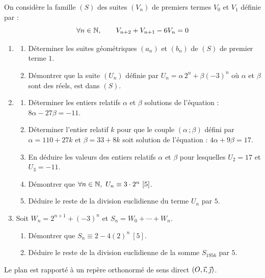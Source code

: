 \documentclass[11pt]{article}
\begin{document}


On considère la famille $(S)$ des suites $(V_n)$ de premiers termes $V_0$ et $V_1$ définie par :
\[ \forall n \in \mathbb{N},\qquad V_{n+2} + V_{n+1} - 6V_n = 0 \]

\begin{enumerate}
  \item \begin{enumerate}[label=\alph*.]
    \item Déterminer les suites géométriques $(a_n)$ et $(b_n)$ de $(S)$ de premier terme $1$.
    \item Démontrer que la suite $(U_n)$ définie par $U_n = \alpha\,2^n + \beta(-3)^n$ où $\alpha$ et $\beta$ sont des réels, est dans $(S)$.
  \end{enumerate}
  \item \begin{enumerate}[label=\alph*.]
    \item Déterminer les entiers relatifs $\alpha$ et $\beta$ solutions de l'équation : $8\alpha - 27\beta = -11$.
    \item Déterminer l'entier relatif $k$ pour que le couple $(\alpha\,;\beta)$ défini par $\alpha = 110 + 27k$ et $\beta = 33 + 8k$ soit solution de l'équation : $4\alpha + 9\beta = 17$.
    \item En déduire les valeurs des entiers relatifs $\alpha$ et $\beta$ pour lesquelles $U_2 = 17$ et $U_3 = -11$.
    \item Démontrer que $\forall n \in \mathbb{N},\ U_n \equiv 3\cdot 2^n\ [5]$.
    \item Déduire le reste de la division euclidienne du terme $U_n$ par $5$.
  \end{enumerate}
  \item Soit $W_n = 2^{n+1} + (-3)^n$ et $S_n = W_0 + \cdots + W_n$.
  \begin{enumerate}[label=\alph*.]
    \item Démontrer que $S_n \equiv 2 - 4(2)^n\ [5]$.
    \item Déduire le reste de la division euclidienne de la somme $S_{1956}$ par $5$.
  \end{enumerate}
\end{enumerate}


Le plan est rapporté à un repère orthonormé de sens direct $(O,\vec{\imath},\vec{\jmath})$.
\end{document}
